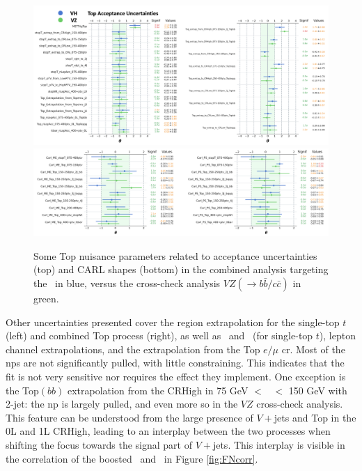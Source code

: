 \begin{figure}[h!]
    \centering
    \includegraphics[width=\textwidth]{Images/VH/Fit/fromSlides/FN/top1.png}\\
    \includegraphics[width=\textwidth]{Images/VH/Fit/fromSlides/FN/top2.png}
    \caption{Some Top nuisance parameters related to acceptance uncertainties (top) and CARL shapes (bottom) in the combined analysis targeting the \vhbc\ in blue, versus the cross-check analysis $VZ(\rightarrow b\bar{b}/c\bar{c})$ in green.}
    \label{apfig:topPull}
\end{figure} 

Other uncertainties presented cover the region extrapolation for the single-top $t$ (left) and combined Top process (right), as well as \nj\ and \ptv\ (for single-top $t$), lepton channel extrapolations, and the extrapolation from the Top $e/\mu$ \gls{cr}. Most of the \glspl{np} are not significantly pulled, with little constraining. This indicates that the fit is not very sensitive nor requires the effect they implement. One exception is the Top$(bb)$ extrapolation from the CRHigh in 75 GeV $<$ \ptv\ $<$ 150 GeV with 2-jet: the \gls{np} is largely pulled, and even more so in the $VZ$ cross-check analysis. This feature can be understood from the large presence of $V+$jets and Top in the 0L and 1L CRHigh, leading to an interplay between the two processes when shifting the focus towards the signal part of $V+$jets. This interplay is visible in the correlation of the boosted \ttb\ and \whf\ in Figure \ref{fig:FNcorr}.

\clearpage


\clearpage

